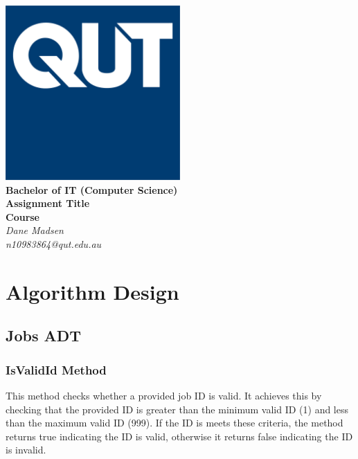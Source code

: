 \documentclass[12pt,a4paper]{article}
\begin{document}
	\begin{titlepage}
		
		\begin{center}
			\includegraphics[width=0.5\textwidth]{QUT.jpg}\\
			[0.03\textheight]  
			\Large\textbf{Bachelor of IT (Computer Science)}\\
			\Large\textbf{Assignment Title}\\
			\large\textbf{Course}\\
			[0.02\textheight]
			\large\textsl{Dane Madsen}\\
			\large\textsl{n10983864@qut.edu.au}
		\end{center}
		
	\end{titlepage}
	\tableofcontents
	\newpage
	
	\section{Algorithm Design}
		\subsection{Jobs ADT}
			\subsubsection{IsValidId Method}
				This method checks whether a provided job ID is valid. It achieves this 
				by checking that the provided ID is greater than the minimum valid ID (1) and 
				less than the maximum valid ID (999). If the ID is meets these criteria, the 
				method returns true indicating the ID is valid, otherwise it returns false 
				indicating the ID is invalid.\\
				
\end{document}
